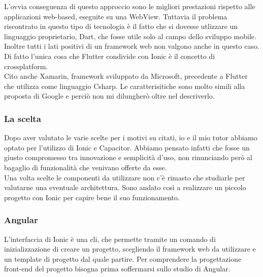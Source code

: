 L'ovvia conseguenza di questo approccio sono le migliori prestazioni rispetto alle applicazioni web-based, eseguite su una WebView.
Tuttavia il problema riscontrato in questo tipo di tecnologia è il fatto che si dovesse utlizzare un linguaggio proprietario, Dart, che
fosse utile solo al campo dello sviluppo mobile. Inoltre tutti i lati positivi di un framework web non valgono anche in questo caso. Di
fatto l'unica cosa che Flutter condivide con Ionic è il concetto di crossplatform. \\
Cito anche Xamarin, framework sviluppato da Microsoft, precedente a Flutter che utilizza come linguaggio \gls{Csharp}. Le
caratterisitiche sono molto simili alla proposta di Google e perciò non mi dilungherò oltre nel descriverlo.

\subsubsection{La scelta}

Dopo aver valutato le varie scelte per i motivi su citati, io e il mio tutor abbiamo optato per l'utilizzo di Ionic e Capacitor. Abbiamo
pensato infatti che fosse un giusto compromesso tra innovazione e semplicità d'uso, non rinunciando però al bagaglio di funzionalità che
venivano offerte da esse. \\
Una volta scelte le componenti da utilizzare non c'è rimasto che studiarle per valutarne una eventuale architettura. Sono andato così a
realizzare un piccolo progetto con Ionic per capire bene il suo funzionamento. \\

\subsubsection{Angular}

L'interfaccia di Ionic è una \gls{cli}, che permette tramite un comando di inizializzazione di creare un progetto, scegliendo il framework
web da utilizzare e un template di progetto dal quale partire. Per comprendere la progettazione front-end del progetto bisogna prima
soffermarsi sullo studio di Angular. \\

